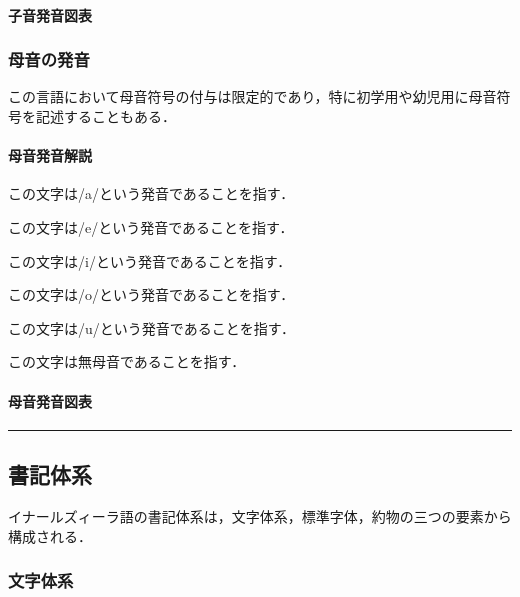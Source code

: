 \documentclass[
  japanese,
]{article}
\providecommand{\tightlist}{%
  \setlength{\itemsep}{0pt}\setlength{\parskip}{0pt}}
\begin{document}
\paragraph{子音発音図表}\label{subsection2.1.2}

\subsubsection{母音の発音}\label{section2.2}

この言語において母音符号の付与は限定的であり，特に初学用や幼児用に母音符号を記述することもある．

\paragraph{母音発音解説}\label{subsection2.2.1}

\begin{description}
\tightlist
\item[{◌a}]
この文字は{/a/}という発音であることを指す．
\item[{◌e}]
この文字は{/e/}という発音であることを指す．
\item[{◌i}]
この文字は{/i/}という発音であることを指す．
\item[{◌o}]
この文字は{/o/}という発音であることを指す．
\item[{◌u}]
この文字は{/u/}という発音であることを指す．
\item[{◌w}]
この文字は無母音であることを指す．
\end{description}

\paragraph{母音発音図表}\label{subsection2.2.2}

\begin{center}\rule{0.5\linewidth}{0.5pt}\end{center}

\subsection{書記体系}\label{chapter3}

イナールズィーラ語の書記体系は，文字体系，標準字体，約物の三つの要素から構成される．

\subsubsection{文字体系}\label{section3.1}
\end{document}

